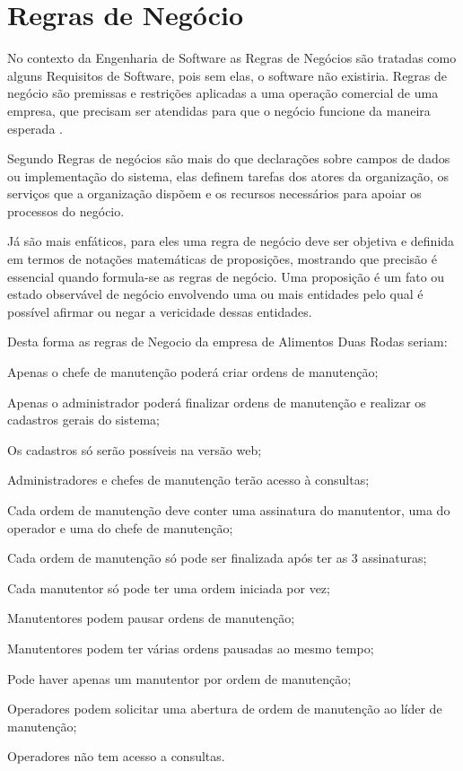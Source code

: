 \section{Regras de Negócio}
No contexto da Engenharia de Software as Regras de Negócios são tratadas como alguns Requisitos de Software, pois sem elas, o software não existiria. Regras de negócio são premissas e restrições aplicadas a uma operação comercial de uma empresa, que precisam ser atendidas para que o negócio funcione da maneira esperada \cite{crerie2008identificacao}.

Segundo \cite{2001SilviaInes} Regras de negócios são mais do que declarações sobre campos de dados ou implementação do sistema, elas definem tarefas dos atores da organização, os serviços que a organização dispõem e os recursos necessários para apoiar os processos do negócio.

Já \cite{1997kilovSimmonds} são mais enfáticos, para eles uma regra de negócio deve ser objetiva e definida em termos de notações matemáticas de proposições, mostrando que precisão é essencial quando formula-se as regras de negócio. Uma proposição é um fato ou estado observável de negócio envolvendo uma ou mais entidades pelo qual é possível afirmar ou negar a vericidade dessas entidades.

Desta forma as regras de Negocio da empresa de Alimentos Duas Rodas seriam:

\begin{subalineas}
	\item {Apenas o chefe de manutenção poderá criar ordens de manutenção};
	\item {Apenas o administrador poderá finalizar ordens de manutenção e realizar os cadastros gerais do sistema};
	\item {Os cadastros só serão possíveis na versão web};
	\item {Administradores e chefes de manutenção terão acesso à consultas};
	\item {Cada ordem de manutenção deve conter uma assinatura do manutentor, uma do operador e uma do chefe de manutenção};
	\item {Cada ordem de manutenção só pode ser finalizada após ter as 3 assinaturas};
	\item {Cada manutentor só pode ter uma ordem iniciada por vez};
	\item {Manutentores podem pausar ordens de manutenção};
	\item {Manutentores podem ter várias ordens pausadas ao mesmo tempo};
	\item {Pode haver apenas um manutentor por ordem de manutenção};
	\item {Operadores podem solicitar uma abertura de ordem de manutenção ao líder de manutenção};
	\item {Operadores não  tem acesso a consultas}.
\end{subalineas}




